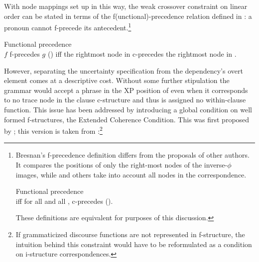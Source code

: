 \documentclass[output=paper,hidelinks]{langscibook}
\begin{document}
\ea\label{bresnan}
\ea\label{bresnanCP}
\ex\label{bresnanNP}
      {}
\z\z

\noindent  With node mappings set up in this way, the weak crossover constraint on linear order can be stated in terms of the f(unctional)-precedence relation defined in :  a pronoun cannot f-precede its antecedent.\footnote{Bresnan's f-precedence definition  differs from the proposals of other authors.  It compares the positions of only the right-most nodes of the inverse-$\phi$ images, while \citet{kaplzaen89} and others take into account all nodes in the correspondence.

\ea \label{f-prec2} Functional precedence  \hsp{1em} \citep{kaplzaen89}\\
 iff for all  and all ,  c-precedes    ().
\z

\noindent These definitions are equivalent for purposes of this discussion.}

\ea \label{f-precbres} Functional precedence  \hsp{1em} \citep{bresnan2001lexical}\\
$f$ f-precedes $g$ () iff the rightmost node in   c-precedes the rightmost node  in .
\z

\hspace*{-1.5pt}However, separating the uncertainty specification from the dependency's overt element comes at a descriptive cost.  Without some further stipulation the grammar would accept a phrase in the XP position of  even when it corresponds to no  trace node in the clause c-structure and thus is assigned no within-clause function.  This issue has been addressed by introducing a global condition on well formed f-structures, the Extended Coherence Condition. This was first proposed by \citet{Zaenen85}; this version is taken from \citet{dalrymple01}:\footnote{If grammaticized discourse functions are not represented in f-structure, the intuition behind this constraint would have to be reformulated as a condition on i-structure correspondences.}
\end{document}
